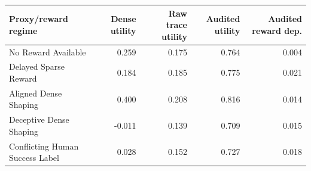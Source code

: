\begin{tabular}{lrrrr}
\toprule
Proxy/reward regime & Dense utility & Raw trace utility & Audited utility & Audited reward dep. \\
\midrule
No Reward Available & 0.259 & 0.175 & 0.764 & 0.004 \\
Delayed Sparse Reward & 0.184 & 0.185 & 0.775 & 0.021 \\
Aligned Dense Shaping & 0.400 & 0.208 & 0.816 & 0.014 \\
Deceptive Dense Shaping & -0.011 & 0.139 & 0.709 & 0.015 \\
Conflicting Human Success Label & 0.028 & 0.152 & 0.727 & 0.018 \\
\bottomrule
\end{tabular}

